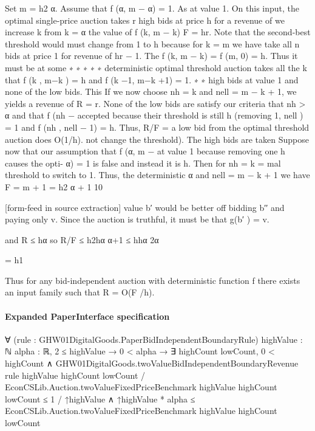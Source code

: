 \documentclass[10pt]{article}
\begin{document}
\begin{ReviewVerbatim}
Set m = h2 α. Assume that f (α, m − α) = 1. As
at value 1. On this input, the optimal single-price
auction takes r high bids at price h for a revenue of we increase k from k = α the value of f (k, m − k)
F = hr. Note that the second-best threshold would must change from 1 to h because for k = m we have
take all n bids at price 1 for revenue of hr − 1. The f (k, m − k) = f (m, 0) = h. Thus it must be at some
∗
∗
∗
∗
∗
deterministic optimal threshold auction takes all the k that f (k , m−k ) = h and f (k −1, m−k +1) = 1.
∗
∗
high bids at value 1 and none of the low bids. This If we now choose nh = k and nell = m − k + 1, we
yields a revenue of R = r. None of the low bids are satisfy our criteria that nh > α and that f (nh −
accepted because their threshold is still h (removing 1, nell ) = 1 and f (nh , nell − 1) = h. Thus, R/F =
a low bid from the optimal threshold auction does O(1/h).
not change the threshold). The high bids are taken
Suppose now that our assumption that f (α, m −
at value 1 because removing one h causes the opti- α) = 1 is false and instead it is h. Then for nh = k =
mal threshold to switch to 1. Thus, the deterministic α and nell = m − k + 1 we have F = m + 1 = h2 α + 1
10


[form-feed in source extraction]
value b′ would be better off bidding b′′ and paying only v. Since the auction is truthful, it must
be that g(b′ ) = v.

and R ≤ hα so
R/F ≤ h2hα
α+1
≤ hhα
2α

= h1

Thus for any bid-independent auction with deterministic function f there exists an input family such
that R = O(F /h).
\end{ReviewVerbatim}


\paragraph{Expanded PaperInterface specification}
\begin{ReviewVerbatim}
∀ (rule : GHW01DigitalGoods.PaperBidIndependentBoundaryRule) {highValue : ℕ} {alpha : ℝ},
  2 ≤ highValue →
    0 < alpha →
      ∃ highCount lowCount,
        0 < highCount ∧
          GHW01DigitalGoods.twoValueBidIndependentBoundaryRevenue rule highValue highCount lowCount /
                EconCSLib.Auction.twoValueFixedPriceBenchmark highValue highCount lowCount ≤
              1 / ↑highValue ∧
            ↑highValue * alpha ≤ EconCSLib.Auction.twoValueFixedPriceBenchmark highValue highCount lowCount
\end{ReviewVerbatim}
\end{document}
